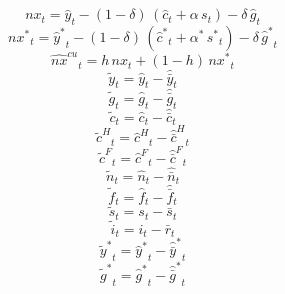 \begin{dmath}
{{nx}}_{t}={{\hat y}}_{t}-\left(1-{{\delta}}\right)\, \left({{\hat c}}_{t}+{{\alpha}}\, {{s}}_{t}\right)-{{\delta}}\, {{\hat g}}_{t}
\end{dmath}
\begin{dmath}
{{nx^*}}_{t}={{\hat y^*}}_{t}-\left(1-{{\delta}}\right)\, \left({{\hat c^*}}_{t}+{{\alpha^*}}\, {{s^*}}_{t}\right)-{{\delta}}\, {{\hat g^*}}_{t}
\end{dmath}
\begin{dmath}
{{\hat{nx}^{cu}}}_{t}={{h}}\, {{nx}}_{t}+\left(1-{{h}}\right)\, {{nx^*}}_{t}
\end{dmath}
\begin{dmath}
{{\tilde y}}_{t}={{\hat y}}_{t}-{{\hat {\bar y}}}_{t}
\end{dmath}
\begin{dmath}
{{\tilde g}}_{t}={{\hat g}}_{t}-{{\hat {\bar g}}}_{t}
\end{dmath}
\begin{dmath}
{{\tilde c}}_{t}={{\hat c}}_{t}-{{\hat {\bar c}}}_{t}
\end{dmath}
\begin{dmath}
{{\tilde c^H}}_{t}={{\hat c^H}}_{t}-{{\hat {\bar c}^H}}_{t}
\end{dmath}
\begin{dmath}
{{\tilde c^F}}_{t}={{\hat c^F}}_{t}-{{\hat {\bar c}^F}}_{t}
\end{dmath}
\begin{dmath}
{{\tilde n}}_{t}={{\hat n}}_{t}-{{\hat {\bar n}}}_{t}
\end{dmath}
\begin{dmath}
{{\tilde f}}_{t}={{\hat f}}_{t}-{{\hat {\bar f}}}_{t}
\end{dmath}
\begin{dmath}
{{\tilde s}}_{t}={{s}}_{t}-{{\bar s}}_{t}
\end{dmath}
\begin{dmath}
{{\tilde i}}_{t}={{i}}_{t}-{{\bar r}}_{t}
\end{dmath}
\begin{dmath}
{{\tilde y^*}}_{t}={{\hat y^*}}_{t}-{{\hat {\bar y}^*}}_{t}
\end{dmath}
\begin{dmath}
{{\tilde g^*}}_{t}={{\hat g^*}}_{t}-{{\hat {\bar g}^*}}_{t}
\end{dmath}
